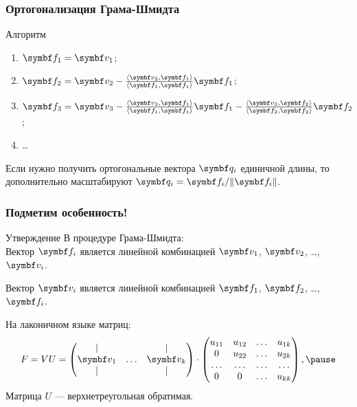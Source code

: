 \begin{frame}
    \frametitle{Ортогонализация Грама-Шмидта}
    
    \begin{block}{Алгоритм}
        \begin{enumerate}
            \item $\bff_1 = \bv_1$; \pause
            \item $\bff_2 = \bv_2 - \frac{ \langle \bv_{2}, \bff_1 \rangle}{\langle \bff_1, \bff_1 \rangle } \bff_1$; \pause
            \item $\bff_3 = \bv_3 - \frac{ \langle \bv_{3}, \bff_1 \rangle}{\langle \bff_1, \bff_1 \rangle } \bff_1  - \frac{ \langle \bv_{3}, \bff_2 \rangle}{\langle \bff_2, \bff_2 \rangle } \bff_2$; \pause
            \item \ldots
        \end{enumerate}        \pause
    \end{block}

    Если нужно получить ортогональные вектора $\bq_i$ единичной длины, то дополнительно масштабируют
    $\bq_i = \bff_i / \norm{\bff_i}$.
    
\end{frame}



\begin{frame}
    \frametitle{Подметим особенность!}

    \begin{block}{Утверждение}
        В процедуре Грама-Шмидта: \\

        Вектор $\bff_i$ является линейной комбинацией $\bv_1$, $\bv_2$, \ldots, $\bv_i$. \pause

        Вектор $\bv_i$ является линейной комбинацией $\bff_1$, $\bff_2$, \ldots, $\bff_i$. \pause    
    \end{block} \pause

    На лаконичном языке матриц:
    \[
        F = VU =  \begin{pmatrix}
            \vert &  & \vert \\
            \bv_1 & \ldots & \bv_k \\
            \vert &  & \vert \\
        \end{pmatrix}  \cdot 
            \begin{pmatrix}
                u_{11} & u_{12} & \ldots & u_{1k} \\
                0 & u_{22} & \ldots & u_{2k} \\
\ldots & \ldots & \ldots & \ldots \\
0 & 0 & \ldots & u_{kk} \\        
            \end{pmatrix}, \pause
    \]
    Матрица $U$ — верхнетреугольная обратимая.

    
\end{frame}


